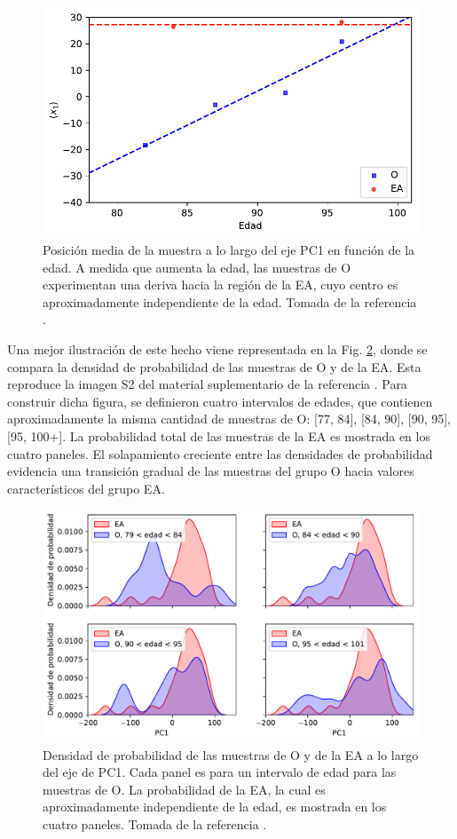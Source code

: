\begin{figure}[!htb]
	\centering
	\includegraphics[width=0.75\linewidth]{figures/O_to_AD_1}
	\caption{Posición media de la muestra a lo largo del eje PC1 en función de la edad. A medida que aumenta la edad, las muestras de O experimentan una deriva hacia la región de la EA, cuyo centro es aproximadamente independiente de la edad. Tomada de la referencia \cite{Gonzalez_2021}.}
	\label{fig:otoad}
\end{figure}

Una mejor ilustración de este hecho viene representada en la Fig. \ref{fig:supplotoad}, donde se compara la densidad de probabilidad de las muestras de O y de la EA. Esta reproduce la imagen S2 del material suplementario de la referencia \cite{Gonzalez_2021}. Para construir dicha figura, se definieron cuatro intervalos de edades, que contienen aproximadamente la misma cantidad de muestras de O: [77, 84], [84, 90], [90, 95], [95, 100+]. La probabilidad total de las muestras de la EA es mostrada en los cuatro paneles. El solapamiento creciente entre las densidades de probabilidad evidencia una transición gradual de las muestras del grupo O hacia valores característicos del grupo EA.

\begin{figure}[!htb]
	\centering
	\includegraphics[width=\linewidth]{figures/suppl_otoad}
	\caption{Densidad de probabilidad de las muestras de O y de la EA a lo largo del eje de PC1. Cada panel es para un intervalo de edad para las muestras de O. La probabilidad de la EA, la cual es aproximadamente independiente de la edad, es mostrada en los cuatro paneles. Tomada de la referencia \cite{Gonzalez_2021}.}
	\label{fig:supplotoad}
\end{figure}

